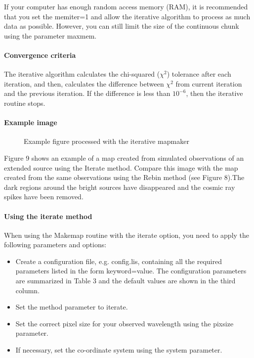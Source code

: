 \documentclass[twoside,11pt]{article}
\renewcommand{\_}{\texttt{\symbol{95}}}
\begin{document}
If your computer has enough random access memory (RAM), it is
recommended that you set the memiter=1 and allow the iterative
algorithm to process as much data as possible. However, you can still
limit the size of the continuous chunk using the parameter maxmem.

\paragraph{Convergence criteria}

The iterative algorithm calculates the chi-squared ($\chi^2$)
tolerance after each iteration, and then, calculates the difference
between $\chi^2$ from current iteration and the previous iteration. If
the difference is less than $10^{-6}$, then the iterative routine
stops.

\paragraph{Example image}

\begin{figure}
\caption{Example figure processed with the iterative mapmaker}
\end{figure}

Figure 9 shows an example of a map created from simulated observations
of an extended source using the Iterate method. Compare this image
with the map created from the same observations using the Rebin method
(see Figure 8).The dark regions around the bright sources have
disappeared and the cosmic ray spikes have been removed.


\paragraph{Using the iterate method}
When using the Makemap routine with the iterate option, you need to apply
the following parameters and options:

\begin{itemize}
\item Create a configuration file, e.g. config.lis, containing all the
  required parameters listed in the form keyword=value. The
  configuration parameters are summarized in Table 3 and the default
  values are shown in the third column.
\item Set the method parameter to iterate.
\item Set the correct pixel size for your observed wavelength using
  the pixsize parameter.
\item If necessary, set the co-ordinate system using the system
  parameter.
\end{itemize}
\end{document}
